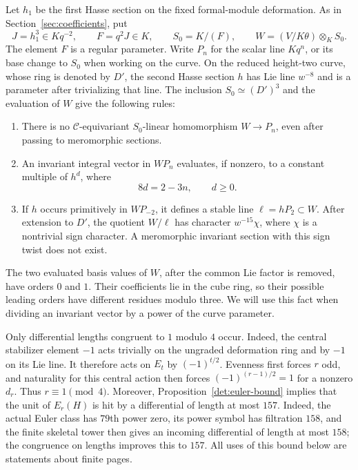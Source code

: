 Let $h_1$ be the first Hasse section on the fixed formal-module
deformation. As in Section~\ref{sec:coefficients}, put
\begin{equation}
 \label{h:curve-data}
 J=h_1^3\in Kq^{-2},\qquad F=q^2J\in K,\qquad
 S_0=K/(F),\qquad W=(V/K\theta)\otimes_K S_0.
\end{equation}
The element $F$ is a regular parameter. Write $P_n$ for the scalar line
$Kq^n$, or its base change to $S_0$ when working on the curve.
On the reduced height-two curve, whose ring is denoted by $D'$,
the second Hasse section $h$ has Lie line $w^{-8}$ and is a parameter
after trivializing that line. The inclusion $S_0\simeq(D')^3$ and the
evaluation of $W$ give the following rules:
\begin{enumerate}[label=(\roman*)]
 \item There is no $\mathcal C$-equivariant $S_0$-linear homomorphism $W\to P_n$,
 even after passing to meromorphic sections.
 \item An invariant integral vector in $WP_n$ evaluates, if nonzero, to
 a constant multiple of $h^d$, where
 \begin{equation}
 \label{h:hasse-rule}
  8d=2-3n,\qquad d\geq0.
 \end{equation}
 \item If $h$ occurs primitively in $WP_{-2}$, it defines a stable line
 $\ell=hP_2\subset W$. After extension to $D'$, the quotient
 $W/\ell$ has character $w^{-15}\chi$, where $\chi$ is a nontrivial
 sign character. A meromorphic invariant section with this sign twist
 does not exist.
\end{enumerate}
The two evaluated basis values of $W$, after the common Lie factor is
removed, have orders $0$ and $1$. Their coefficients lie in the cube
ring, so their possible leading orders have different residues modulo
three. We will use this fact when dividing an invariant vector by a
power of the curve parameter.

Only differential lengths congruent to $1$ modulo $4$ occur. Indeed,
the central stabilizer element $-1$ acts trivially on the ungraded
deformation ring and by $-1$ on its Lie line. It therefore acts on
$E_t$ by $(-1)^{t/2}$. Evenness first forces $r$ odd, and naturality
for this central action then forces $(-1)^{(r-1)/2}=1$ for a nonzero
$d_r$. Thus $r\equiv1\pmod4$. Moreover,
Proposition~\ref{det:euler-bound} implies that the unit of $E_r(H)$ is
hit by a differential of length at most $157$. Indeed, the actual Euler
class has $79$th power zero, its power symbol has filtration $158$, and
the finite skeletal tower then gives an incoming differential of length
at most $158$; the congruence on lengths improves this to $157$. All
uses of this bound below are statements about finite pages.


